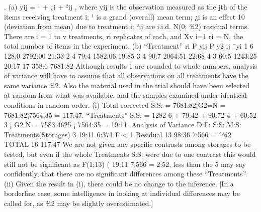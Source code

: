 \documentclass[a4paper,12pt]{article}
\begin{document}
. (a) yij = ¹ + ¿i + ²ij , where yij is the observation measured as the jth of the
items receiving treatment i; ¹ is a grand (overall) mean term; ¿i is an effect
10
(deviation from mean) due to treatment i; ²ij are i.i.d. N(0; ¾2) residual
terms. There are i = 1 to v treatments, ri replicates of each, and
Xv
i=1
ri = N,
the total number of items in the experiment.
(b)
“Treatment” ri
P
yij
P
y2
ij ¯yi
1 6 128:0 2792:00 21:33
2 4 79:4 1582:06 19:85
3 4 90:7 2064:51 22:68
4 3 60:5 1243:25 20:17
17 358:6 7681:82
Although results 1 are rounded to whole numbers, analysis of variance will
have to assume that all observations on all treatments have the same variance
¾2. Also the material used in the trial should have been selected at
random from what was available, and the samples examined under identical
conditions in random order.
(i) Total corrected S:S: = 7681:82¡G2=N = 7681:82¡7564:35 = 117:47. “Treatments”
S:S: =
1282
6
+
79:42 + 90:72
4
+
60:52
3
¡
G2
N
= 7583:4625 ¡ 7564:35 = 19:11.
Analysis of Variance D:F: S:S: M:S:
Treatments(Storages) 3 19:11 6:371 F < 1
Residual 13 98:36 7:566 = ˆ¾2
TOTAL 16 117:47
We are not given any specific contrasts among storages to be tested, but
even if the whole Treatments S:S: were due to one contrast this would still
not be significant as F(1;13) ( 19:11
7:566 = 2:52, less than the 5%
may say confidently, that there are no significant differences among these
“Treatments”.
(ii) Given the result in (i), there could be no change to the inference. [In a
borderline case, some intelligence in looking at individual differences may be
called for, as ¾2 may be slightly overestimated.]
\end{document}
